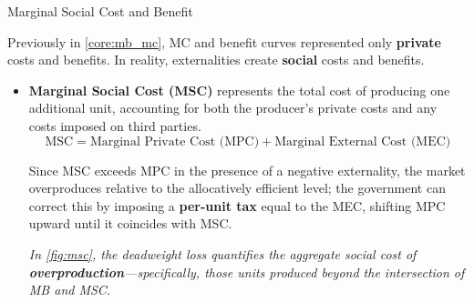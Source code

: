\documentclass[10pt]{article}
\begin{document}
    \begin{core}{Marginal Social Cost and Benefit}

      Previously in \autoref{core:mb_mc}, MC and benefit curves represented only \textbf{private} costs and benefits. In reality, externalities create \textbf{social} costs and benefits.

      \begin{itemize}

        \item \textbf{Marginal Social Cost (MSC)} represents the total cost of producing one additional unit, accounting for both the producer's private costs and any costs imposed on third parties.
        \[
          \text{MSC} = \text{Marginal Private Cost (MPC)} + \text{Marginal External Cost (MEC)}
        \]

        Since MSC exceeds MPC in the presence of a negative externality, the market overproduces relative to the allocatively efficient level; the government can correct this by imposing a \textbf{per-unit tax} equal to the MEC, shifting MPC upward until it coincides with MSC.

        \textit{In \autoref{fig:msc}, the deadweight loss quantifies the aggregate social cost of \textbf{overproduction}---specifically, those units produced beyond the intersection of MB and MSC.}

\end{itemize}
\end{core}
\end{document}
